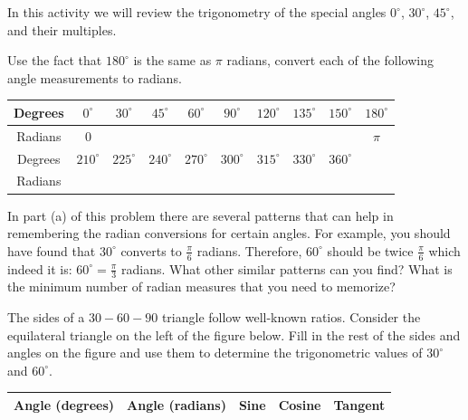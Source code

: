 \begin{activity}\label{A:0.5.1}
    In this activity we will review the trigonometry of the special angles $0^\circ$,
    $30^\circ$, $45^\circ$, and their multiples.
    \ba
        \item Use the fact that $180^\circ$ is the same as $\pi$ radians, convert each of
            the following angle measurements to radians.
            \begin{center}
                \begin{tabular}{|c||c|c|c|c|c|c|c|c|c|}
                    \hline
                    Degrees & $0^\circ$ & $30^\circ$ & $45^\circ$ & $60^\circ$ &
                    $90^\circ$ & $120^\circ$ & $135^\circ$ & $150^\circ$ & $180^\circ$ \\ \hline
                    Radians & 0 & & & & & & & & $\pi$ \\ \hline
                    \hline 
                    Degrees & $210^\circ$ & $225^\circ$ & $240^\circ$ & $270^\circ$ &
                    $300^\circ$ & $315^\circ$ & $330^\circ$ & $360^\circ$ &  \\ \hline
                    Radians & & & & & & & & & \\ \hline
                \end{tabular}
            \end{center}
        \item In part (a) of this problem there are several patterns that can help in
            remembering the radian conversions for certain angles.  For example, you
            should have found that $30^\circ$ converts to $\frac{\pi}{6}$ radians.
            Therefore, $60^\circ$ should be twice $\frac{\pi}{6}$ which indeed it is:
            $60^\circ = \frac{\pi}{3}$ radians.  What other similar patterns can you find?
            What is the minimum number of radian measures that you need to memorize?
        \item The sides of a $30-60-90$ triangle follow well-known ratios.  Consider the
            equilateral triangle on the left of the figure below.  Fill in the rest of the
            sides and angles on the figure and use them to determine the trigonometric values of $30^\circ$ and
            $60^\circ$.
            \begin{center}
                \begin{tabular}{|c|c||c|c|c|}
                    \hline
                    Angle (degrees) & Angle (radians) & Sine & Cosine & Tangent \\ \hline

\end{tabular}
\end{center}
\end{activity}
